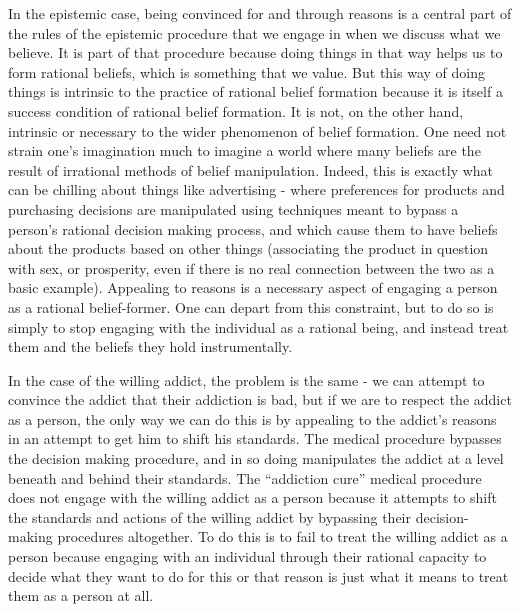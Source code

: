\documentclass[phd,12pt,oneside,paper=letterpaper]{ubcthesis}
\begin{document}
In the epistemic case, being convinced for and through reasons is a central part of the rules of the epistemic procedure that we engage in when we discuss what we believe. It is part of that procedure because doing things in that way helps us to form rational beliefs, which is something that we value. But this way of doing things is intrinsic to the practice of rational belief formation because it is itself a success condition of rational belief formation. It is not, on the other hand, intrinsic or necessary to the wider phenomenon of belief formation. One need not strain one's imagination much to imagine a world where many beliefs are the result of irrational methods of belief manipulation. Indeed, this is exactly what can be chilling about things like advertising - where preferences for products and purchasing decisions are manipulated using techniques meant to bypass a person's rational decision making process, and which cause them to have beliefs about the products based on other things (associating the product in question with sex, or prosperity, even if there is no real connection between the two as a basic example). Appealing to reasons is a necessary aspect of engaging a person as a rational belief-former. One can depart from this constraint, but to do so is simply to stop engaging with the individual as a rational being, and instead treat them and the beliefs they hold instrumentally. 

In the case of the willing addict, the problem is the same - we can attempt to convince the addict that their addiction is bad, but if we are to respect the addict as a person, the only way we can do this is by appealing to the addict's reasons in an attempt to get him to shift his standards. The medical procedure bypasses the decision making procedure, and in so doing manipulates the addict at a level beneath and behind their standards. The ``addiction cure'' medical procedure does not engage with the willing addict as a person because it attempts to shift the standards and actions of the willing addict by bypassing their decision-making procedures altogether. To do this is to fail to treat the willing addict as a person because engaging with an individual through their rational capacity to decide what they want to do for this or that reason is just what it means to treat them as a person at all. 
\end{document}
